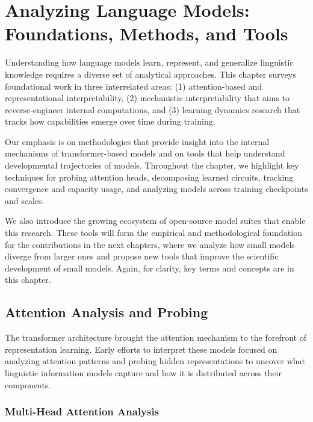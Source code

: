 \chapter{Analyzing Language Models: Foundations, Methods, and Tools}
\label{chapter:analysis-background}

Understanding how language models learn, represent, and generalize linguistic knowledge requires a diverse set of analytical approaches. This chapter surveys foundational work in three interrelated areas: (1) attention-based and representational interpretability, (2) mechanistic interpretability that aims to reverse-engineer internal computations, and (3) learning dynamics research that tracks how capabilities emerge over time during training. 

Our emphasis is on methodologies that provide insight into the internal mechanisms of transformer-based models and on tools that help understand developmental trajectories of models. Throughout the chapter, we highlight key techniques for probing attention heads, decomposing learned circuits, tracking convergence and capacity usage, and analyzing models across training checkpoints and scales.

We also introduce the growing ecosystem of open-source model suites that enable this research. These tools will form the empirical and methodological foundation for the contributions in the next chapters, where we analyze how small models diverge from larger ones and propose new tools that improve the scientific development of small models. Again, for clarity, key terms and concepts are  in this chapter.

\section{Attention Analysis and Probing}

The transformer architecture \citep{vaswani2017attention} brought the attention mechanism to the forefront of representation learning. Early efforts to interpret these models focused on analyzing attention patterns and probing hidden representations to uncover what linguistic information models capture and how it is distributed across their components.

\subsection{Multi-Head Attention Analysis}

